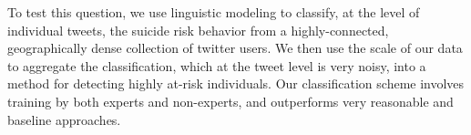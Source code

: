 \documentclass[11pt]{article}
\begin{document}
To test this question, we use linguistic modeling to classify, at the level of individual tweets, the suicide risk behavior from a highly-connected, geographically dense collection of twitter users. We then use the scale of our data to aggregate the classification, which at the tweet level is very noisy, into a method for detecting highly at-risk individuals. Our classification scheme involves training by both experts and non-experts, and outperforms very reasonable and baseline approaches.

\end{document}
